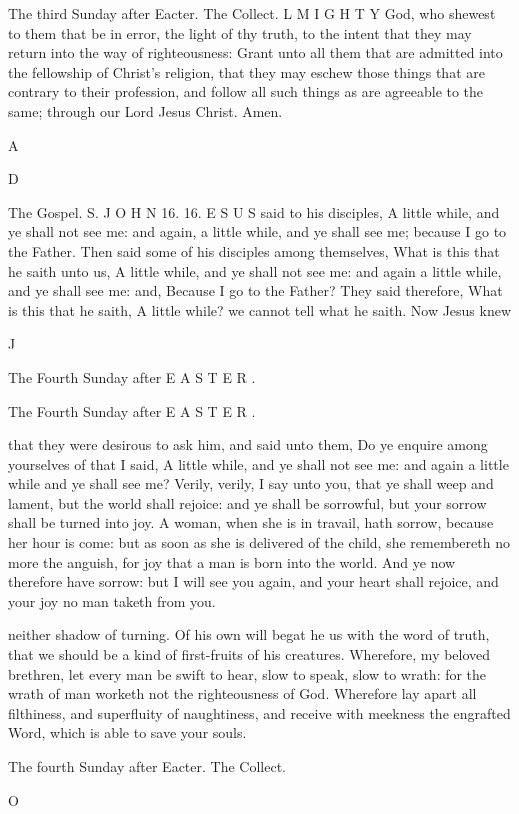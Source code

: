 The third Sunday after Eacter. The Collect. L M I G H T Y God, who shewest to them that be in error, the light of thy truth, to the intent that they may return into the way of righteousness: Grant unto all them that are admitted into the fellowship of Christ’s religion, that they may eschew those things that are contrary to their profession, and follow all such things as are agreeable to the same; through our Lord Jesus Christ. Amen.

A

D

The Gospel. S. J O H N 16. 16. E S U S said to his disciples, A little while, and ye shall not see me: and again, a little while, and ye shall see me; because I go to the Father. Then said some of his disciples among themselves, What is this that he saith unto us, A little while, and ye shall not see me: and again a little while, and ye shall see me: and, Because I go to the Father? They said therefore, What is this that he saith, A little while? we cannot tell what he saith. Now Jesus knew

J

The Fourth Sunday after E A S T E R .

The Fourth Sunday after E A S T E R .

that they were desirous to ask him, and said unto them, Do ye enquire among yourselves of that I said, A little while, and ye shall not see me: and again a little while and ye shall see me? Verily, verily, I say unto you, that ye shall weep and lament, but the world shall rejoice: and ye shall be sorrowful, but your sorrow shall be turned into joy. A woman, when she is in travail, hath sorrow, because her hour is come: but as soon as she is delivered of the child, she remembereth no more the anguish, for joy that a man is born into the world. And ye now therefore have sorrow: but I will see you again, and your heart shall rejoice, and your joy no man taketh from you.

neither shadow of turning. Of his own will begat he us with the word of truth, that we should be a kind of first-fruits of his creatures. Wherefore, my beloved brethren, let every man be swift to hear, slow to speak, slow to wrath: for the wrath of man worketh not the righteousness of God. Wherefore lay apart all filthiness, and superfluity of naughtiness, and receive with meekness the engrafted Word, which is able to save your souls.

The fourth Sunday after Eacter. The Collect.

O

